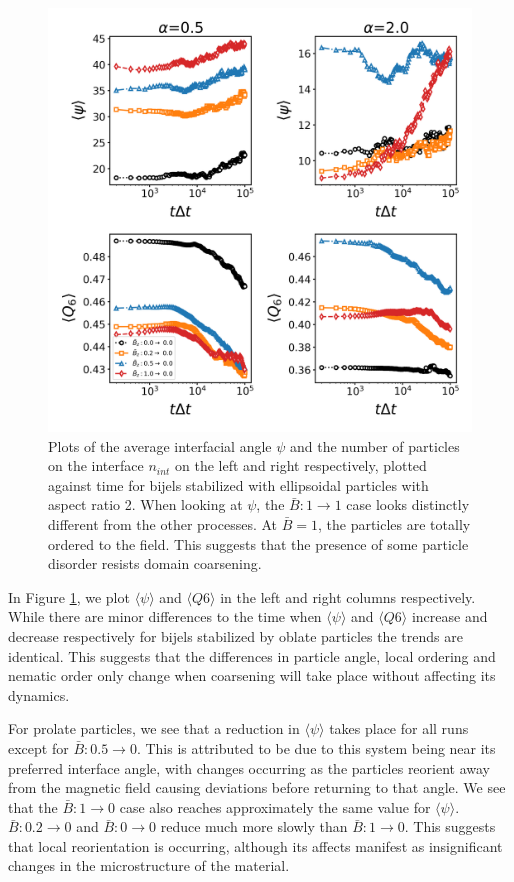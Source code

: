 \begin{figure} 
\centering 
\includegraphics[scale=0.4]{../figures/results/paper2/interface_angle-nint-field_down.png} 
\caption{Plots of the average interfacial angle $\psi$ and the number of particles on the interface $n_{int}$ on the left and right respectively, plotted against time for bijels stabilized with ellipsoidal particles with aspect ratio 2. When looking at $\psi$, the $\bar{B}:1 \rightarrow 1$ case looks distinctly different from the other processes. At $\bar{B} = 1$, the particles are totally ordered to the field. This suggests that the presence of some particle disorder resists domain coarsening.} 
\label{fig:interface_angle-field_down} 
\end{figure}

In Figure \ref{fig:interface_angle-field_down}, we plot
\(\langle \psi \rangle\) and \(\langle Q6 \rangle\) in the left and
right columns respectively. While there are minor differences to the
time when \(\langle \psi \rangle\) and \(\langle Q6 \rangle\) increase
and decrease respectively for bijels stabilized by oblate particles the
trends are identical. This suggests that the differences in particle
angle, local ordering and nematic order only change when coarsening will
take place without affecting its dynamics.

For prolate particles, we see that a reduction in
\(\langle \psi \rangle\) takes place for all runs except for
\(\bar{B}: 0.5\rightarrow 0\). This is attributed to be due to this
system being near its preferred interface angle, with changes occurring
as the particles reorient away from the magnetic field causing
deviations before returning to that angle. We see that the
\(\bar{B}: 1\rightarrow 0\) case also reaches approximately the same
value for \(\langle \psi \rangle\). \(\bar{B}: 0.2\rightarrow 0\) and
\(\bar{B}: 0\rightarrow 0\) reduce much more slowly than
\(\bar{B}: 1\rightarrow 0\). This suggests that local reorientation is
occurring, although its affects manifest as insignificant changes in the
microstructure of the material.

